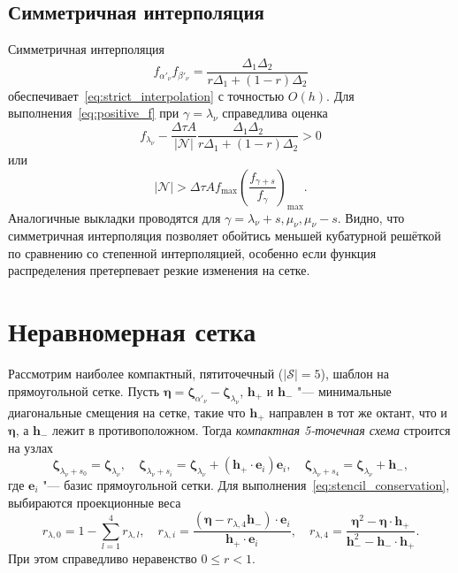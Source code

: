 \documentclass[a4paper,12pt]{article}
\newcommand{\bzeta}{\boldsymbol{\zeta}}
\newcommand{\bh}{\boldsymbol{h}}
\newcommand{\be}{\boldsymbol{e}}
\newcommand{\Nu}{\mathcal{N}}
\newcommand{\OO}[1]{O(#1)}
\begin{document}
\subsection{Симметричная интерполяция}

Симметричная интерполяция
\begin{equation}\label{eq:uniform_spm}
    f_{\alpha'_\nu}f_{\beta'_\nu} = \frac{\Delta_1\Delta_2}{r\Delta_1+(1-r)\Delta_2}
\end{equation}
обеспечивает~\eqref{eq:strict_interpolation} с точностью \(\OO{h}\).
Для выполнения~\eqref{eq:positive_f} при \(\gamma = \lambda_\nu\) справедлива оценка
\begin{equation}\label{eq:positive_f_lambda_uniform_spm}
   f_{\lambda_\nu} - \frac{\Delta\tau A}{|\Nu|} \frac{\Delta_1\Delta_2}{r\Delta_1+(1-r)\Delta_2} > 0
\end{equation}
или
\begin{equation}\label{eq:positive_f_lambda_uniform_spm2}
   |\Nu| > \Delta\tau A f_{\max} \left(\frac{f_{\gamma+s}}{f_\gamma}\right)_{\max}.
\end{equation}
Аналогичные выкладки проводятся для \(\gamma = \lambda_\nu+s, \mu_\nu, \mu_\nu-s\).
Видно, что симметричная интерполяция позволяет обойтись меньшей кубатурной решёткой
по сравнению со степенной интерполяцией, особенно если функция распределения претерпевает
резкие изменения на сетке.

\section{Неравномерная сетка}

Рассмотрим наиболее компактный, пятиточечный (\(|\mathcal{S}|=5\)), шаблон на прямоугольной сетке.
Пусть \(\boldsymbol{\eta} = \bzeta_{\alpha'_\nu} - \bzeta_{\lambda_\nu}\),
\(\bh_+\) и \(\bh_-\) "--- минимальные диагональные смещения на сетке,
такие что \(\bh_+\) направлен в тот же октант, что и \(\boldsymbol{\eta}\),
а \(\bh_-\) лежит в противоположном.
Тогда \emph{компактная 5-точечная схема} строится на узлах
\begin{equation}\label{eq:stencil_nodes}
    \bzeta_{\lambda_\nu+s_0} = \bzeta_{\lambda_\nu}, \quad
    \bzeta_{\lambda_\nu+s_i} = \bzeta_{\lambda_\nu} + (\bh_+\cdot \be_i)\be_i, \quad
    \bzeta_{\lambda_\nu+s_4} = \bzeta_{\lambda_\nu} + \bh_-,
\end{equation}
где \(\be_i\) "--- базис прямоугольной сетки.
Для выполнения~\eqref{eq:stencil_conservation}, выбираются проекционные веса
\begin{equation}\label{eq:stencil_weights}
    r_{\lambda,0} = 1 - \sum_{l=1}^4 r_{\lambda,l}, \quad
    r_{\lambda,i} = \frac{(\boldsymbol{\eta} - r_{\lambda,4}\bh_-)\cdot\be_i}
        {\bh_+\cdot\be_i}, \quad
    r_{\lambda,4} = \frac{\boldsymbol{\eta}^2 - \boldsymbol{\eta}\cdot\bh_+}
        {\bh_-^2 - \bh_-\cdot\bh_+}.
\end{equation}
При этом справедливо неравенство \(0\leq r < 1\).
\end{document}
